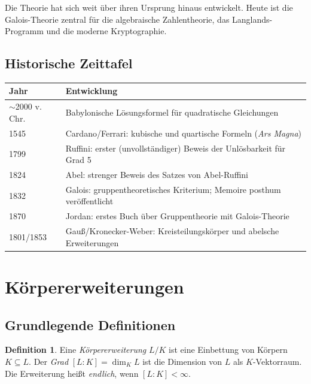 \documentclass[12pt,a4paper]{amsart}
\theoremstyle{definition}
\newtheorem{definition}[theorem]{Definition}
\begin{document}
Die Theorie hat sich weit über ihren Ursprung hinaus entwickelt. Heute ist
die Galois-Theorie zentral für die algebraische Zahlentheorie, das
Langlands-Programm und die moderne Kryptographie.

\subsection*{Historische Zeittafel}

\begin{center}
\begin{tabular}{ll}
\toprule
Jahr & Entwicklung \\
\midrule
$\sim$2000 v.\,Chr. & Babylonische Lösungsformel für quadratische Gleichungen \\
1545 & Cardano/Ferrari: kubische und quartische Formeln (\emph{Ars Magna}) \\
1799 & Ruffini: erster (unvollständiger) Beweis der Unlösbarkeit für Grad 5 \\
1824 & Abel: strenger Beweis des Satzes von Abel-Ruffini \\
1832 & Galois: gruppentheoretisches Kriterium; Memoire posthum veröffentlicht \\
1870 & Jordan: erstes Buch über Gruppentheorie mit Galois-Theorie \\
1801/1853 & Gauß/Kronecker-Weber: Kreisteilungskörper und abelsche Erweiterungen \\
\bottomrule
\end{tabular}
\end{center}

\section{Körpererweiterungen}
\label{sec:koerper}

\subsection{Grundlegende Definitionen}

\begin{definition}
Eine \emph{Körpererweiterung} $L/K$ ist eine Einbettung von Körpern
$K \subseteq L$. Der \emph{Grad} $[L:K] = \dim_K L$ ist die Dimension von
$L$ als $K$-Vektorraum. Die Erweiterung heißt \emph{endlich}, wenn
$[L:K] < \infty$.
\end{definition}
\end{document}

